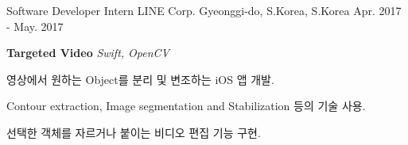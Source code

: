 \begin{cventries}

  \cventry
    {Software Developer Intern} %
    {LINE Corp.} %
    {Gyeonggi-do, S.Korea, S.Korea} %
    {Apr. 2017 - May. 2017} %
    {
      \begin{cvitems} %
        \item[] {\textbf{Targeted Video} \hspace{1cm} \textit{Swift, OpenCV}}
        \item[] {영상에서 원하는 Object를 분리 및 변조하는 iOS 앱 개발.}
        \item {Contour extraction, Image segmentation and Stabilization 등의 기술 사용.}
        \item {선택한 객체를 자르거나 붙이는 비디오 편집 기능 구현.}
      \end{cvitems}
    }


\end{cventries}
